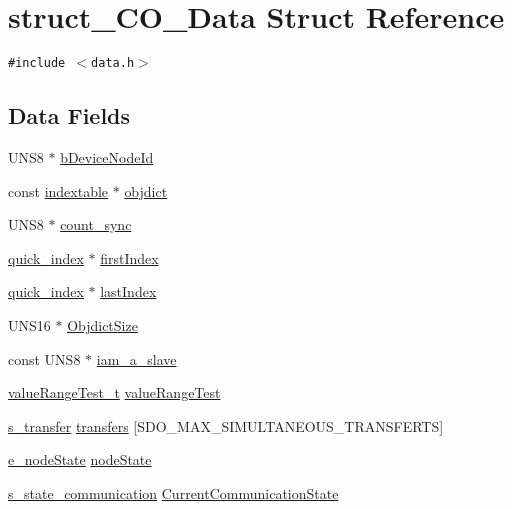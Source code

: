 \hypertarget{structstruct__CO__Data}{
\section{struct\_\-CO\_\-Data Struct Reference}
\label{structstruct__CO__Data}
}
{\tt \#include $<$data.h$>$}

\subsection*{Data Fields}
\begin{CompactItemize}
\item 
UNS8 $\ast$ \hyperlink{structstruct__CO__Data_e5c35e97a1061bb9737359cc12192269}{b\-Device\-Node\-Id}
\item 
const \hyperlink{structtd__indextable}{indextable} $\ast$ \hyperlink{structstruct__CO__Data_a766a4db603786bffdd609817048ef04}{objdict}
\item 
UNS8 $\ast$ \hyperlink{structstruct__CO__Data_83ae82d4401e78e3fd3a1ed5d457ade7}{count\_\-sync}
\item 
\hyperlink{structs__quick__index}{quick\_\-index} $\ast$ \hyperlink{structstruct__CO__Data_f26b0fce2ed684c5983aa658efd6c52e}{first\-Index}
\item 
\hyperlink{structs__quick__index}{quick\_\-index} $\ast$ \hyperlink{structstruct__CO__Data_96d334a4fc8c304826b053681ccbf0d1}{last\-Index}
\item 
UNS16 $\ast$ \hyperlink{structstruct__CO__Data_6c3f14328d7662f0adc1da9964327a2e}{Objdict\-Size}
\item 
const UNS8 $\ast$ \hyperlink{structstruct__CO__Data_cfe2baf2887f190ca8deebaf462e62fe}{iam\_\-a\_\-slave}
\item 
\hyperlink{objacces_8h_270e94e9acf61da8b2f36b3ebdbf2fdd}{value\-Range\-Test\_\-t} \hyperlink{structstruct__CO__Data_a8e71f9e9e67d0a594bad7dbbe99a35a}{value\-Range\-Test}
\item 
\hyperlink{structstruct__s__transfer}{s\_\-transfer} \hyperlink{structstruct__CO__Data_a7fda2c6f5815323c3d79efb4641c465}{transfers} \mbox{[}SDO\_\-MAX\_\-SIMULTANEOUS\_\-TRANSFERTS\mbox{]}
\item 
\hyperlink{states_8h_5891f63a4c9243179838389a93d084e2}{e\_\-node\-State} \hyperlink{structstruct__CO__Data_a03a5121facf5b21d541f8566a8345d6}{node\-State}
\item 
\hyperlink{structs__state__communication}{s\_\-state\_\-communication} \hyperlink{structstruct__CO__Data_ab01aa22a1af1044224220cd45e5796d}{Current\-Communication\-State}

\end{CompactItemize}
